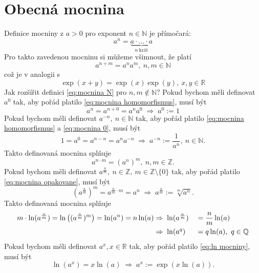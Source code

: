 \section{Obecná mocnina}
Definice mocniny z $a>0$ pro exponent $n\in \mathbb{N}$ je přímočará:
\begin{equation}\label{eq:mocnina N}
	a^{n}=\underbrace{a\cdot \hdots \cdot a}_{n\ \text{krát}}
\end{equation}
Pro takto zavedenou mocninu si můžeme všimnout, že platí
\begin{equation}\label{eq:mocnina homomorfismus}
  a^{n+m}=a^{n}a^{m},\ n,m\in \mathbb{N}
\end{equation}
což je v analogii s
\begin{equation*}
  \exp(x+y)=\exp(x)\exp(y),\ x,y\in \mathbb{R}
\end{equation*}
Jak rozšířit definici \ref{eq:mocnina N} pro $n,m\not\in \mathbb{N}?$ Pokud bychom měli definovat $a^{0}$ tak, aby pořád platilo \ref{eq:mocnina homomorfismus}, musí být
\begin{equation}\label{eq:mocnina 0}
  a^{n}=a^{n+0}=a^{n}a^{0} \; \Rightarrow \; a^{0}:=1
\end{equation}
Pokud bychom měli definovat $a^{-n},\ n\in\mathbb{N}$ tak, aby pořád platilo \ref{eq:mocnina homomorfismus} a \ref{eq:mocnina 0}, musí být
\begin{equation}\label{eq:mocnina Z}
  1=a^{0}=a^{n-n}=a^{n}a^{-n} \; \Rightarrow \; a^{-n}:=\frac{1}{a^{n}},\ n\in \mathbb{N}.
\end{equation}
Takto definovaná mocnina splňuje
\begin{equation}\label{eq:mocnina opakovane}
 a^{n\cdot m} = (a^{n})^{m},\ n,m\in \mathbb{Z}.
\end{equation}
Pokud bychom měli definovat $a^{\frac{n}{m}},\ n\in \mathbb{Z},\ m\in \mathbb{Z}\setminus \{0\}$ tak, aby pořád platilo \ref{eq:mocnina opakovane}, musí být
\begin{equation}\label{eq:mocnina Q}
	(a^{\frac{n}{m}})^{m} = a^{\frac{n}{m}\cdot m}=a^{n} \; \Rightarrow \; a^{\frac{n}{m}}:=\sqrt[m]{a^{n}}.
\end{equation}
Takto definovaná mocnina splňuje
\begin{alignat}{4}\label{eq:ln mocniny}
	m\cdot \ln(a^{\frac{n}{m}})=\ln\left( (a^{\frac{n}{m}})^{m}\right)=\ln(a^{n})=n\ln(a) &\Rightarrow \; \ln(a^{\frac{n}{m}})&&=\frac{n}{m}\ln(a)\notag \\
	&\Rightarrow  \; \ln(a^{q})&&=q\ln(a),\ q\in \mathbb{Q}
\end{alignat}
Pokud bychom měli definovat $a^{x}, x\in \mathbb{R}$ tak, aby pořád platilo \ref{eq:ln mocniny}, musí být
\begin{equation*}
	\ln(a^{x})=x\ln(a) \; \Rightarrow \; a^{x}:=\exp(x \ln(a)).
\end{equation*}

